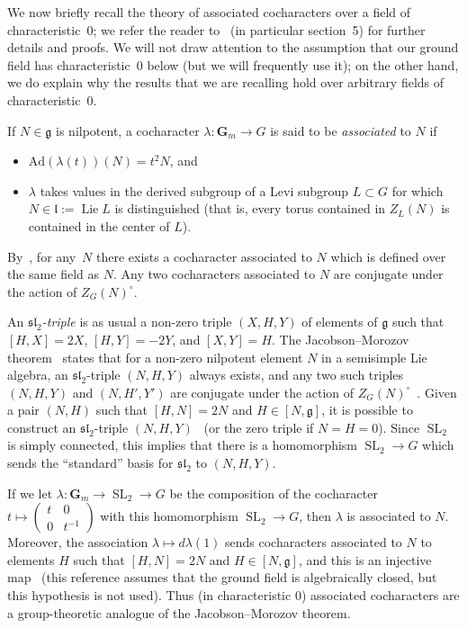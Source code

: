 \documentclass{amsart}
\renewcommand{\mathbb}{\mathbf}
\def\Ad{\mathrm{Ad}}
\DeclareMathOperator{\Lie}{Lie}
\DeclareMathOperator{\SL}{SL}
\def\sl{\mathfrak{sl}}
\def\sl{\mathfrak{sl}}
\theoremstyle{definition}
\theoremstyle{remark}
\newcommand{\mar}[1]{}
\newcommand{\mar}[1]{\marginpar{\raggedright\tiny squirrel #1}}
\newcommand{\GG}{{\mathbb G}}
\def\sl{\mathfrak{sl}}
\newcommand{\Gm}{\GG_m}
\begin{document}
We now briefly recall the theory of associated cocharacters over a
field of characteristic~$0$; we refer
the reader to~\cite{jantzen} (in particular section~5) for further
details and proofs. We will not draw attention to the assumption that
our ground field has characteristic~$0$ below (but we will frequently
use it); on the other hand, we do explain why the results that we are
recalling hold over arbitrary fields of characteristic~$0$.

 If $N\in\mathfrak{g}$ is nilpotent, a
cocharacter $\lambda:\Gm\rightarrow G$ is said to be \emph{associated}
to $N$ if
\begin{itemize}
\item $\Ad(\lambda(t))(N)=t^2N$, and
\item  $\lambda$ takes values in the
  derived subgroup of a Levi subgroup $L\subset G$ for which
  $N\in\mathfrak{l}:=\Lie L$ is distinguished (that is, every torus contained in
  $Z_L(N)$ is contained in the center of $L$).
\end{itemize}
By~\cite[Thm.\ 26]{mcninch}, for
any~$N$ there exists a cocharacter associated to $N$ which is defined over the same field as $N$.  Any two cocharacters associated to $N$ are conjugate under the action of $Z_G(N)^\circ$.

An \emph{$\sl_2$-triple} is as usual a non-zero triple $(X,H,Y)$ of elements of
$\mathfrak{g}$ such that $[H,X]=2X$, $[H,Y]=-2Y$, and $[X,Y]=H$.  The
Jacobson--Morozov theorem~\cite[Ch.\ VIII \S 11 Prop.\ 2]{MR2109105}  states
that for a non-zero nilpotent element $N$ in a semisimple Lie algebra,
an $\sl_2$-triple $(N,H,Y)$ always exists, and any two such triples
$(N,H,Y)$ and $(N,H',Y')$ are conjugate under the action of
$Z_G(N)^\circ$~\cite[Ch.\ VIII \S 11 Prop.\ 1]{MR2109105}.  Given a
pair $(N,H)$ such that $[H,N]=2N$ and
$H\in [N,\mathfrak{g}]$, it is possible to construct an $\sl_2$-triple
$(N,H,Y)$~\cite[Ch.\ VIII \S 11 Lem.\ 6]{MR2109105} (or the zero
triple if $N=H=0$).  Since $\SL_2$ is simply connected, this implies that there
is a homomorphism $\SL_2\rightarrow G$ which sends the ``standard''
basis for $\sl_2$ to $(N,H,Y)$.

If we let $\lambda:\Gm\rightarrow \SL_2\rightarrow G$ be the
composition of the cocharacter $t\mapsto
\left(\begin{smallmatrix}t&0\\0&t^{-1}\end{smallmatrix}\right)$ %
with this homomorphism
$\SL_2\rightarrow G$, then $\lambda$ is associated to $N$.  Moreover,
the association $\lambda\mapsto d\lambda(1)$ sends cocharacters
associated to $N$ to elements $H$ such that $[H,N]=2N$ and
$H\in [N,\mathfrak{g}]$, and this is an injective map~\cite[Prop.\
5.5]{jantzen} (this reference assumes that the ground field is
algebraically closed, but this hypothesis is not used).  Thus (in
characteristic $0$) associated cocharacters are a group-theoretic
analogue of the Jacobson--Morozov theorem.%
\end{document}

